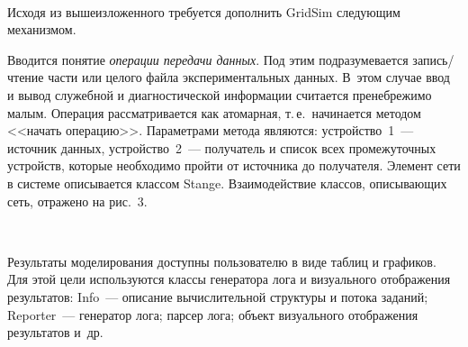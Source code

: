 \begin{figure} %
\vspace*{1pt}
 \begin{center}
 \mbox{%
 \epsfxsize=160.035mm
 }
 \end{center}
 \vspace*{-6pt}
\end{figure}

\begin{multicols}{2}


   
   Исходя из вышеизложенного требуется дополнить GridSim следующим 
механизмом. 

Вводится понятие \textit{операции передачи данных}. Под этим 
подразумевается за\-пись/чте\-ние час\-ти или целого файла экспериментальных 
данных. В~этом случае ввод и вывод служебной и диагностической 
информации считается пренебрежимо малым. Операция 
   рас\-смат\-ри\-ва\-ет\-ся как атомарная, т.\,е.\ начинается методом <<начать 
операцию>>. Параметрами метода являются: устройство~1~--- источник 
данных,
 устройство~2~--- получатель и список всех промежуточных устройств, 
которые необходимо пройти от источника до получателя. Элемент сети в 
системе описывается классом Stange. Взаимодействие классов, описывающих 
сеть, отражено на рис.~3.

\begin{figure*} %
\vspace*{9pt}
 \begin{center}
 \mbox{%
 \epsfxsize=97.571mm
 }
 \end{center}
 \vspace*{-6pt}
\end{figure*}

   Результаты моделирования доступны пользователю в виде таблиц и 
графиков. Для этой цели используются классы генератора лога и визуального 
отображения результатов:
Info~--- описание вы\-чис\-ли\-тель\-ной структуры и потока заданий;
Reporter~--- генератор лога;
парсер лога;
объект визуального отображения результатов и~др.


\end{multicols}
